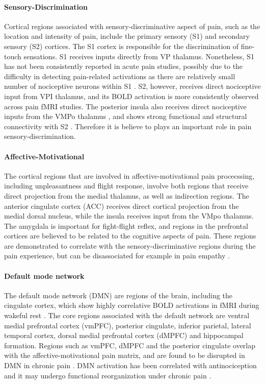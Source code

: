\paragraph{Sensory-Discrimination}
Cortical regions associated with sensory-discriminative aspect of pain, such as the location and intensity of pain, include the primary sensory (S1) and secondary sensory (S2) cortices. The S1 cortex is responsible for the discrimination of fine-touch sensations. S1 receives inputs directly from VP thalamus. Nonetheless, S1 has not been consistently reported in acute pain studies, possibly due to the difficulty in detecting pain-related activations as there are relatively small number of nociceptive neurons within S1 \cite{bushnell1999pain}. S2, however, receives direct nociceptive input from VPI thalamus, and its BOLD activation is more consistently observed across pain fMRI studies. The posterior insula also receives direct nociceptive inputs from the VMPo thalamus \cite{Craig2003}, and shows strong functional and structural connectivity with S2 \cite{Wiech2014}. Therefore it is believe to plays an important role in pain sensory-discrimination. 

\paragraph{Affective-Motivational}
The cortical regions that are involved in affective-motivational pain procecssing, including unpleasantness and flight response, involve both regions that receive direct projection from the medial thalamus, as well as indirection regions. The anterior cingulate cortex (ACC) receives direct cortical projection from the medial dorsal nucleus, while the insula receives input from the VMpo thalamus. The amygdala is important for fight-flight reflex, and regions in the prefrontal cortices are believed to be related to the cognitive aspects of pain. These regions are demonstrated to correlate with the sensory-discriminative regions during the pain experience, but can be disassociated for example in pain empathy \cite{Singer2004}. 

\paragraph{Default mode network}
The default mode network (DMN) are regions of the brain, including the cingulate cortex, which show highly correlative BOLD activations in fMRI during wakeful rest \cite{Greicius2003,Raichle2015}. The core regions associated with the default network are ventral medial prefrontal cortex (vmPFC), posterior cingulate, inferior parietal, lateral temporal cortex, dorsal medial prefrontal cortex (dMPFC) and hippocampal formation. Regions such as vmPFC, dMPFC and the posterior cingulate overlap with the affective-motivational pain matrix, and are found to be disrupted in DMN in chronic pain \cite{Baliki2008}. DMN activation has been correlated with antinociception \cite{Kucyi2013} and it may undergo functional reorganization under chronic pain \cite{Baliki2014}. 

